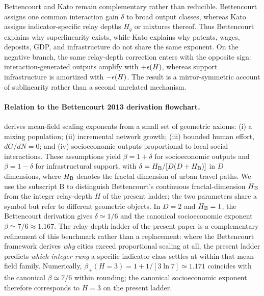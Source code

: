 Bettencourt and Kato remain complementary rather than reducible. Bettencourt
assigns one common interaction gain $\delta$ to broad output classes, whereas
Kato assigns indicator-specific relay depths $H_q$ or mixtures thereof. Thus
Bettencourt explains why superlinearity exists, while Kato explains why patents,
wages, deposits, GDP, and infrastructure do not share the same exponent. On the
negative branch, the same relay-depth correction enters with the opposite sign:
interaction-generated outputs amplify with $+\epsilon\!\left(H\right)$, whereas support
infrastructure is amortized with $-\epsilon\!\left(H\right)$. The result is a mirror-symmetric
account of sublinearity rather than a second unrelated mechanism.

\paragraph{Relation to the Bettencourt 2013 derivation flowchart.}
\citet{Bettencourt2013} derives mean-field scaling exponents
from a small set of geometric axioms: (i) a mixing population; (ii) incremental
network growth; (iii) bounded human effort, $dG/dN=0$; and
(iv) socioeconomic outputs proportional to local social interactions.
These assumptions yield $\beta=1+\delta$ for socioeconomic outputs and
$\beta=1-\delta$ for infrastructural support, with
$\delta=H_{\rm B}/[D(D+H_{\rm B})]$ in $D$ dimensions, where $H_{\rm B}$
denotes the fractal dimension of urban travel paths. We use the subscript
B to distinguish Bettencourt's continuous fractal-dimension $H_{\rm B}$
from the integer relay-depth $H$ of the present ladder; the two parameters
share a symbol but refer to different geometric objects.
In $D=2$ and $H_{\rm B}=1$, the Bettencourt derivation gives
$\delta\simeq 1/6$ and the canonical socioeconomic exponent
$\beta\simeq 7/6\approx 1.167$.
The relay-depth ladder of the present paper is a complementary refinement
of this benchmark rather than a replacement: where the Bettencourt
framework derives \emph{why} cities exceed proportional scaling at all,
the present ladder predicts \emph{which integer rung} a specific
indicator class settles at within that mean-field family.
Numerically, $\beta_+(H{=}3)=1+1/[3\ln 7]\simeq 1.171$ coincides with the
canonical $\beta\simeq 7/6$ within rounding; the canonical socioeconomic
exponent therefore corresponds to $H{=}3$ on the present ladder.

